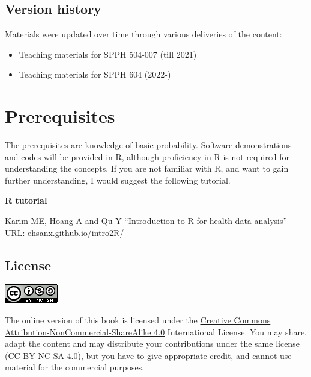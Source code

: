 \documentclass[
]{book}
\providecommand{\tightlist}{%
  \setlength{\itemsep}{0pt}\setlength{\parskip}{0pt}}
\begin{document}
\hypertarget{version-history}{%
\subsection*{Version history}\label{version-history}}

Materials were updated over time through various deliveries of the content:

\begin{itemize}
\tightlist
\item
  Teaching materials for SPPH 504-007 (till 2021)
\item
  Teaching materials for SPPH 604 (2022-)
\end{itemize}

\hypertarget{prerequisites}{%
\section*{Prerequisites}\label{prerequisites}}

The prerequisites are knowledge of basic probability. Software demonstrations and codes will be provided in R, although proficiency in R is not required for understanding the concepts. If you are not familiar with R, and want to gain further understanding, I would suggest the following tutorial.

\begin{rmdcomment}
\textbf{R tutorial}

Karim ME, Hoang A and Qu Y ``Introduction to R for health data
analysis'' URL:
\href{https://ehsanx.github.io/intro2R/}{ehsanx.github.io/intro2R/}
\end{rmdcomment}

\hypertarget{license}{%
\subsection*{License}\label{license}}

\includegraphics[width=0.25\linewidth]{images/by-nc-sa}

The online version of this book is licensed under the \href{https://creativecommons.org/licenses/by-nc-sa/4.0/}{Creative Commons Attribution-NonCommercial-ShareAlike 4.0} International License. You may share, adapt the content and may distribute your contributions under the same license (CC BY-NC-SA 4.0), but you have to give appropriate credit, and cannot use material for the commercial purposes.
\end{document}
